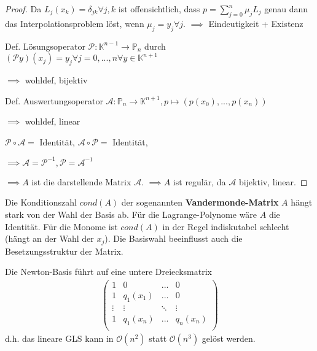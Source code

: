 \begin{proof}
	Da $L_j(x_k) = \delta_{jk} \forall j,k$ ist offensichtlich, dass $p=\sum_{j=0}^{n} \mu_j L_j$ genau dann das Interpolationsproblem löst, wenn $\mu_j=y_j \forall j$. $\implies$ Eindeutigkeit + Existenz
	
	Def. Lösungsoperator $\mathcal{P}: \mathbb{K}^{n-1} \rightarrow \mathbb{P}_n$ durch $(\mathcal{P}y)(x_j) = y_j \forall j=0, ..., n \forall y \in \mathbb{K}^{n+1}$
	
	$\implies$ wohldef, bijektiv
	
	Def. Auswertungsoperator $\mathcal{A}: \mathbb{P}_n \rightarrow \mathbb{K}^{n+1}, p \mapsto (p(x_0), ..., p(x_n))$
	
	$\implies$ wohldef, linear
	
	$\mathcal{P} \circ \mathcal{A} =$ Identität, $\mathcal{A} \circ \mathcal{P} =$ Identität,
	
	$\implies \mathcal{A} = \mathcal{P}^{-1}, \mathcal{P} = \mathcal{A}^{-1}$
	
	$\implies A$ ist die darstellende Matrix $\mathcal{A}$. $\implies A$ ist regulär, da $\mathcal{A}$ bijektiv, linear.
\end{proof}

\begin{remark}
	Die Konditionszahl $cond(A)$ der sogenannten \textbf{Vandermonde-Matrix} $A$ hängt stark von der Wahl der Basis ab. Für die Lagrange-Polynome wäre $A$ die Identität. Für die Monome ist $cond(A)$ in der Regel indiskutabel schlecht (hängt an der Wahl der $x_j$). Die Basiswahl beeinflusst auch die Besetzungsstruktur der Matrix.
\end{remark}

\begin{example}
	Die Newton-Basis führt auf eine untere Dreiecksmatrix
	\begin{align*}
		\left(\begin{matrix}
			1 & 0 & ... & 0\\
			1 & q_1(x_1) & ... & 0\\
			\vdots & \vdots & \ddots & \vdots\\
			1 & q_1(x_n) & ... & q_n(x_n)\\
		\end{matrix}\right)
	\end{align*}
	d.h. das lineare GLS kann in $\mathcal{O}(n^2)$ statt $\mathcal{O}(n^3)$ gelöst werden.
\end{example}

